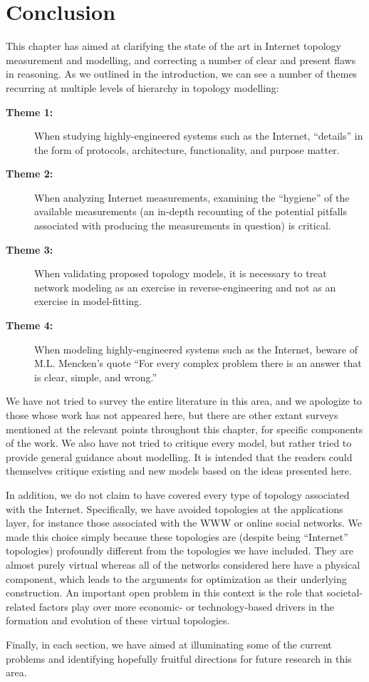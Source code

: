 \section{Conclusion}
\label{sec:conclusion}

This chapter has aimed at clarifying the state of the art in Internet
topology measurement and modelling, and correcting a number of clear
and present flaws in reasoning. As we outlined in the introduction, we
can see a number of themes recurring at multiple levels of hierarchy
in topology modelling: 

\begin{description}

\item[{\bf Theme 1:}] When studying highly-engineered systems such as
  the Internet, ``details'' in the form of protocols, architecture,
  functionality, and purpose matter.

\item[{\bf Theme 2:}] When analyzing Internet measurements, examining
  the ``hygiene'' of the available measurements (\ie an in-depth
  recounting of the potential pitfalls associated with producing the
  measurements in question) is critical.

\item[{\bf Theme 3:}] When validating proposed topology models, it is
  necessary to treat network modeling as an exercise in
  reverse-engineering and not as an exercise in model-fitting.

\item[{\bf Theme 4:}] When modeling highly-engineered systems such as
  the Internet, beware of M.L. Mencken's quote ``For every complex
  problem there is an answer that is clear, simple, and wrong.''

\end{description}

We have not tried to survey the entire literature in this area, and we
apologize to those whose work has not appeared here, but there are
other extant surveys mentioned at the relevant points throughout this
chapter, for specific components of the work. We also have not tried
to critique every model, but rather tried to provide general guidance
about modelling. It is intended that the readers could themselves
critique existing and new models based on the ideas presented here.

In addition, we do not claim to have covered every type of topology
associated with the Internet. Specifically, we have avoided topologies
at the applications layer, for instance those associated with the WWW
or online social networks.  We made this choice simply because these
topologies are (despite being ``Internet'' topologies) profoundly
different from the topologies we have included. They are almost purely
virtual whereas all of the networks considered here have a physical
component, which leads to the arguments for optimization as their
underlying construction.  An important open problem in this context is
the role that societal-related factors play over more economic- or
technology-based drivers in the formation and evolution of these
virtual topologies.

Finally, in each section, we have aimed at illuminating some of the
current problems and identifying hopefully fruitful directions for
future research in this area.
